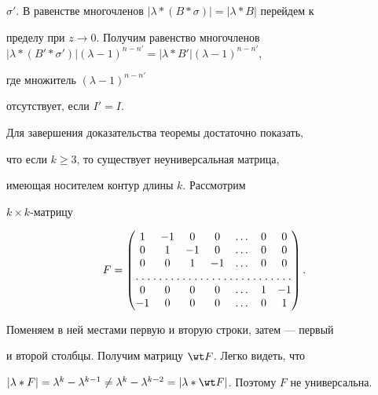 \begin{pf}
\begin{pf}
$\sigma'$. В равенстве многочленов $|\lambda\ast(B\ast\sigma)|= |\lambda\ast 


B|$ перейдем к 


пределу при $z\to0$. Получим равенство многочленов $|\lambda\ast 


(B'\ast\sigma')| (\lambda-1)^{n-n'}= |\lambda\ast B'|(\lambda-1)^{n-n'}$, 


где множитель $(\lambda-1)^{n-n'}$ 


отсутствует, если $I'=I$. 


\end{pf} 


 


Для завершения доказательства теоремы достаточно показать,  


что если $k\ge3$, то существует неуниверсальная матрица,  


имеющая носителем контур длины $k$. Рассмотрим 


$k\times k$-матрицу 


$$ 


F= 


\begin{pmatrix} 


1 & -1 & 0 & 0 & \dotsc & 0 & 0 \\ 


0 & 1 & -1 & 0 & \dotsc & 0 & 0 \\ 


0 & 0 & 1 & -1 & \dotsc & 0 & 0 \\ 


\hdotsfor[1.5]{7}\\ 


0 & 0 & 0 & 0 & \dotsc & 1 & -1 \\ 


-1 & 0 & 0 & 0 & \dotsc & 0 & 1 


\end{pmatrix} 


. 


$$ 


Поменяем в ней местами первую и вторую строки, затем --- первый  


и второй столбцы. Получим матрицу $\wt F$. Легко видеть, что 


$|\lambda\ast F|=\lambda^k-\lambda^{k-1}\ne \lambda^k-\lambda^{k-2}= 


|\lambda\ast\wt F|$. Поэтому $F$ не универсальна. 


\end{pf} 


